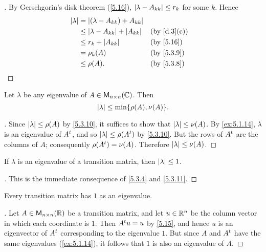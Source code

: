 \begin{proof}[]
  By Gerschgorin's disk theorem (\cref{5.16}), \(\left\lvert\lambda - A_{k k}\right\rvert \leq r_k\) for some \(k\).
  Hence
  \begin{align*}
    \abs{\lambda} & = \abs{(\lambda - A_{k k}) + A_{k k}}                                       \\
                  & \leq \abs{\lambda - A_{k k}} + \abs{A_{k k}} &  & \text{(by \cref{d.3}(c))} \\
                  & \leq r_k + \abs{A_{k k}}                     &  & \text{(by \cref{5.16})}   \\
                  & = \rho_k(A)                                  &  & \text{(by \cref{5.3.9})}  \\
                  & \leq \rho(A).                                &  & \text{(by \cref{5.3.8})}
  \end{align*}
\end{proof}

\begin{cor}\label{5.3.11}
  Let \(\lambda\) be any eigenvalue of \(A \in \mathsf{M}_{{n} \times n}({\mathbb{C}})\).
  Then
  \[
    \abs{\lambda} \leq \min\set{\rho(A), \nu(A)}.
  \]
\end{cor}

\begin{proof}[]
  Since \(\left\lvert\lambda\right\rvert \leq \rho(A)\) by \cref{5.3.10}, it suffices to show that \(\left\lvert\lambda\right\rvert \leq \nu(A)\).
  By \cref{ex:5.1.14}, \(\lambda\) is an eigenvalue of \({A}^{t}\), and so \(\left\lvert\lambda\right\rvert \leq \rho({A}^{t})\) by \cref{5.3.10}.
  But the rows of \({A}^{t}\) are the columns of \(A\);
  consequently \(\rho({A}^{t}) = \nu(A)\).
  Therefore \(\left\lvert\lambda\right\rvert \leq \nu(A)\).
\end{proof}

\begin{cor}\label{5.3.12}
  If \(\lambda\) is an eigenvalue of a transition matrix, then \(\left\lvert\lambda\right\rvert \leq 1\).
\end{cor}

\begin{proof}[]
  This is the immediate consequence of \cref{5.3.4} and \cref{5.3.11}.
\end{proof}

\begin{thm}\label{5.17}
  Every transition matrix has \(1\) as an eigenvalue.
\end{thm}

\begin{proof}[]
  Let \(A \in \mathsf{M}_{{n} \times n}({\mathbb{R}})\) be a transition matrix, and let \(u \in \mathbb{R}^n\) be the column vector in which each coordinate is \(1\).
  Then \({A}^{t} u = u\) by \cref{5.15}, and hence \(u\) is an eigenvector of \({A}^{t}\) corresponding to the eigenvalue \(1\).
  But since \(A\) and \({A}^{t}\) have the same eigenvalues (\cref{ex:5.1.14}), it follows that \(1\) is also an eigenvalue of \(A\).
\end{proof}
